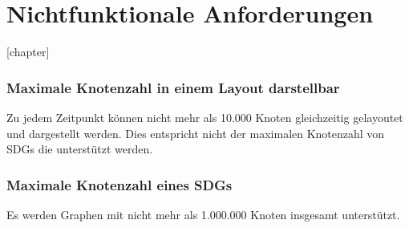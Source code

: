 \chapter{Nichtfunktionale Anforderungen}
\label{ch:nfa}

[chapter]
\setcounter{nfanr}{10}
\newcommand{\nfano}[1]{\subsection{#1}\addtocounter{nfanr}{10}}
\newcommand{\nsubfano}[1]{\subsubsection{#1}\addtocounter{nfanr}{1}}
\renewcommand\thesubsection{/NFA\ifnum\value{nfanr}<10 000\else\ifnum\value{nfanr}<100 00\else\ifnum\value{nfanr}<1000 0\fi\fi\fi\arabic{nfanr}/}
\renewcommand\thesubsubsection{/NFA\ifnum\value{nfanr}<10 000\else\ifnum\value{nfanr}<100 00\else\ifnum\value{nfanr}<1000 0\fi\fi\fi\arabic{nfanr}/}


\nfano{Maximale Knotenzahl in einem Layout darstellbar}\label{nfa:max_knoten_}
Zu jedem Zeitpunkt können nicht mehr als 10.000 Knoten gleichzeitig gelayoutet und dargestellt werden. Dies entspricht nicht der maximalen Knotenzahl von SDGs die unterstützt werden.

\nfano{Maximale Knotenzahl eines SDGs}\label{nfa:max_knoten_total}
Es werden Graphen mit nicht mehr als 1.000.000 Knoten insgesamt unterstützt.

